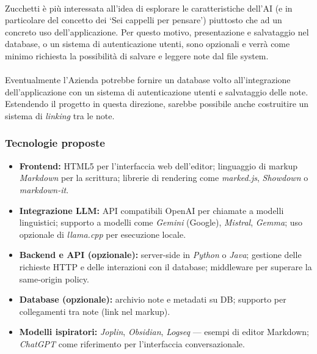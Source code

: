 \documentclass[a4paper,11pt]{article}
\begin{document}
\paragraph{}
Zucchetti è più interessata all'idea di esplorare le caratteristiche dell'AI (e in particolare del concetto dei `Sei cappelli per pensare') piuttosto che ad un concreto uso dell'applicazione. Per questo motivo,
presentazione e salvataggio nel database, o un sistema di autenticazione utenti, sono opzionali e verrà come minimo richiesta la possibilità di salvare e leggere note dal file system.
\paragraph{}
Eventualmente l'Azienda potrebbe fornire un database volto all'integrazione dell'applicazione con un sistema di autenticazione utenti e salvataggio delle note. 
Estendendo il progetto in questa direzione, sarebbe possibile anche costruitire un sistema di \textit{linking} tra le note.
\subsubsection{Tecnologie proposte}
\begin{itemize}[noitemsep, topsep=0pt]
  \item \textbf{Frontend:} HTML5 per l'interfaccia web dell’editor; linguaggio di markup \textit{Markdown} per la scrittura; librerie di rendering come \textit{marked.js}, \textit{Showdown} o \textit{markdown-it}.
  \item \textbf{Integrazione LLM:} API compatibili OpenAI per chiamate a modelli linguistici; supporto a modelli come \textit{Gemini} (Google), \textit{Mistral}, \textit{Gemma}; uso opzionale di \textit{llama.cpp} per esecuzione locale.
  \item \textbf{Backend e API (opzionale):} server-side in \textit{Python} o \textit{Java}; gestione delle richieste HTTP e delle interazioni con il database; middleware per superare la same-origin policy.
  \item \textbf{Database (opzionale):} archivio note e metadati su DB; supporto per collegamenti tra note (link nel markup).
  \item \textbf{Modelli ispiratori:} \textit{Joplin}, \textit{Obsidian}, \textit{Logseq} — esempi di editor Markdown; \textit{ChatGPT} come riferimento per l’interfaccia conversazionale.
\end{itemize}
\end{document}
